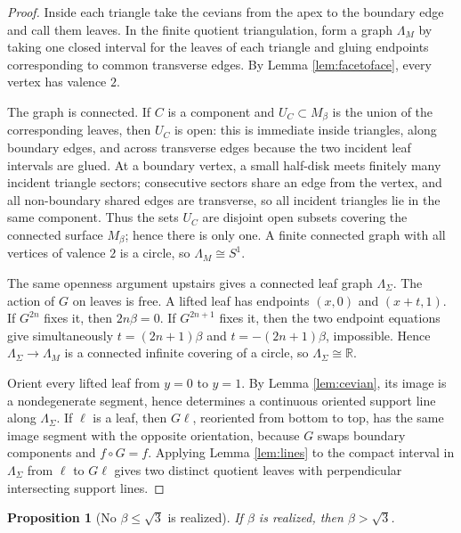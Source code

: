 \documentclass[12pt]{article}
\newcommand{\R}{\mathbb R}
\theoremstyle{plain}
\newtheorem{proposition}[theorem]{Proposition}
\begin{document}
\begin{proof}
Inside each triangle take the cevians from the apex to the boundary edge and
call them leaves.  In the finite quotient triangulation, form a graph
\(\Lambda_M\) by taking one closed interval for the leaves of each triangle and
gluing endpoints corresponding to common transverse edges.  By
Lemma \ref{lem:facetoface}, every vertex has valence \(2\).

The graph is connected.  If \(C\) is a component and \(U_C\subset M_\beta\) is
the union of the corresponding leaves, then \(U_C\) is open: this is immediate
inside triangles, along boundary edges, and across transverse edges because the
two incident leaf intervals are glued.  At a boundary vertex, a small half-disk
meets finitely many incident triangle sectors; consecutive sectors share an
edge from the vertex, and all non-boundary shared edges are transverse, so all
incident triangles lie in the same component.  Thus the sets \(U_C\) are
disjoint open subsets covering the connected surface \(M_\beta\); hence there
is only one.  A finite connected graph with all vertices of valence \(2\) is a
circle, so \(\Lambda_M\cong S^1\).

The same openness argument upstairs gives a connected leaf graph
\(\Lambda_\Sigma\).  The action of \(G\) on leaves is free.  A lifted leaf has
endpoints \((x,0)\) and \((x+t,1)\).  If \(G^{2n}\) fixes it, then
\(2n\beta=0\).  If \(G^{2n+1}\) fixes it, then the two endpoint equations give
simultaneously \(t=(2n+1)\beta\) and \(t=-(2n+1)\beta\), impossible.  Hence
\(\Lambda_\Sigma\to\Lambda_M\) is a connected infinite covering of a circle,
so \(\Lambda_\Sigma\cong\R\).

Orient every lifted leaf from \(y=0\) to \(y=1\).  By
Lemma \ref{lem:cevian}, its image is a nondegenerate segment, hence determines
a continuous oriented support line along \(\Lambda_\Sigma\).  If \(\ell\) is a
leaf, then \(G\ell\), reoriented from bottom to top, has the same image segment
with the opposite orientation, because \(G\) swaps boundary components and
\(f\circ G=f\).  Applying Lemma \ref{lem:lines} to the compact interval in
\(\Lambda_\Sigma\) from \(\ell\) to \(G\ell\) gives two distinct quotient
leaves with perpendicular intersecting support lines.
\end{proof}

\begin{proposition}[No \(\beta\le\sqrt3\) is realized]\label{prop:lower}
If \(\beta\) is realized, then \(\beta>\sqrt3\).
\end{proposition}
\end{document}
